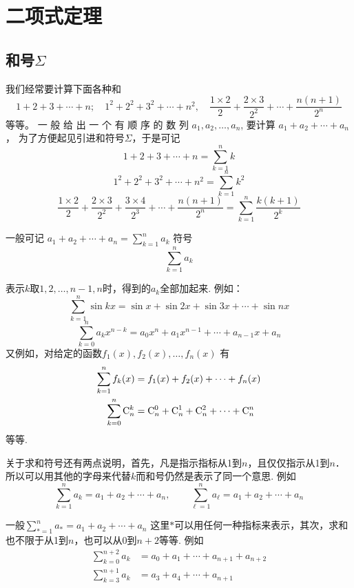 \section{二项式定理}

\subsection{和号$\Sigma$}

我们经常要计算下面各种和
$$1+ 2+ 3+ \cdots + n;\quad 1^{2}+ 2^{2}+ 3^{2}+ \cdots + n^{2},\quad \frac{1\times2}{2}+\frac{2\times3}{2^{2}}+\cdots+\frac{n(n+1)}{2^{n}}$$
等等。 一 般 给 出 一 个 有 顺 序 的 数 列 $a_1, a_2, \ldots , a_n$, 要计算
$a_{1}+a_{2}+\cdots+a_{n}$，
为了方便起见引进和符号$\Sigma$，于是可记
$$1+2+3+\cdots+n=\sum_{k=1}^{n}k$$
\[1^{2}+ 2^{2}+ 3^{2}+ \cdots + n^{2}=\sum^n_{k=1}k^2\]
\[\frac{1\times2}{2}+\frac{2\times3}{2^{2}}+\frac{3\times4}{2^{3}}+\cdots+\frac{n(n+1)}{2^{n}}=\sum^n_{k=1}\frac{k(k+1)}{2^k}\]

一般可记
$a_1+a_2+\cdots+a_n=\sum_{k=1}^{n}a_k$
符号
$$\sum_{k=1}^{n}a_k$$

表示$k$取$1,2,\ldots,n-1,n$时，得到的$a_k$全部加起来.
例如：
$$\sum_{k=1}^{n}\sin kx=\sin x+\sin2x+\sin3x+\cdots+\sin nx$$
$$\sum _{k= 0}^{n}a_{k} x^{n- k}= a_{0} x^{n}+ a_{1} x^{n- 1}+ \cdots + a_{n- 1} x+ a_{n}$$
又例如，对给定的函数$f_1(x),f_2(x),\ldots,f_n(x)$
有
\[\begin{split}
\sum^n_{k=1}f_k(x)&=f_1(x)+f_2(x)+\cdots +f_n(x)
\\
\sum^n_{k=0}{\rm C}^{k}_{n} &={\rm C}^{0}_{n}+{\rm C}^{1}_{n}+{\rm C}^{2}_{n}+\cdots +{\rm C}^{n}_{n}
\end{split}\]
等等.

关于求和符号还有两点说明，首先，凡是指示指标从1到$n$，且仅仅指示从1到$n$．所以可以用其他的字母来代替$k$而和号仍然是表示了同一个意思. 例如
\[\sum^n_{k=1}a_k=a_1+a_2+\cdots+a_n,\qquad \sum^n_{\ell=1}a_{\ell}=a_1+a_2+\cdots+a_n\]

一般$\sum\limits^n_{*=1}a_*=a_1+a_2+\cdots+a_n$
这里$*$可以用任何一种指标来表示，其次，求和也不限于从1到$n$，也可以从0到$n+2$等等. 例如
\[\begin{split}
    \sum^{n+2}_{k=0}a_k&=a_0+a_1+\cdots+a_{n+1}+a_{n+2}\\
    \sum^{n+1}_{k=3}a_k&=a_3+a_4+\cdots+a_{n+1}
\end{split}\]

